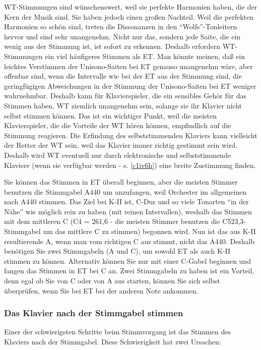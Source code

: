 WT-Stimmungen sind wünschenswert, weil sie perfekte Harmonien haben, die der Kern der Musik sind.
Sie haben jedoch einen großen Nachteil.
Weil die perfekten Harmonien so schön sind, treten die Dissonanzen in den \enquote{Wolfs}-Tonleitern hervor und sind sehr unangenehm.
Nicht nur das, sondern jede Saite, die ein wenig aus der Stimmung ist, ist sofort zu erkennen.
Deshalb erfordern WT-Stimmungen ein viel häufigeres Stimmen als ET.
Man könnte meinen, daß ein leichtes Verstimmen der Unisono-Saiten bei ET genauso unangenehm wäre, aber offenbar sind, wenn die Intervalle wie bei der ET aus der Stimmung sind, die geringfügigen Abweichungen in der Stimmung der Unisono-Saiten bei ET weniger wahrnehmbar.
Deshalb kann für Klavierspieler, die ein sensibles Gehör für das Stimmen haben, WT ziemlich unangenehm sein, solange sie ihr Klavier nicht selbst stimmen können.
Das ist ein wichtiger Punkt, weil die meisten Klavierspieler, die die Vorteile der WT hören können, empfindlich auf die Stimmung reagieren.
Die Erfindung des selbststimmenden Klaviers kann vielleicht der Retter der WT sein, weil das Klavier immer richtig gestimmt sein wird.
Deshalb wird WT eventuell nur durch elektronische und selbststimmende Klaviere (wenn sie verfügbar werden - s. \hyperref[c1iv6h]{\autoref{c1iv6h}}) eine breite Zustimmung finden.

Sie können das Stimmen in ET überall beginnen, aber die meisten Stimmer benutzen die Stimmgabel A440 um anzufangen, weil Orchester im allgemeinen nach A440 stimmen.
Das Ziel bei K-II ist, C-Dur und so viele Tonarten \enquote{in der Nähe} wie möglich rein zu haben (mit reinen Intervallen), weshalb das Stimmen mit dem mittleren C (C4 = 261,6 - die meisten Stimmer benutzen die C523,3-Stimmgabel um das mittlere C zu stimmen) begonnen wird.
Nun ist das aus K-II resultierende A, wenn man vom richtigen C aus stimmt, nicht das A440.
Deshalb benötigen Sie zwei Stimmgabeln (A und C), um sowohl ET als auch K-II stimmen zu können.
Alternativ können Sie nur mit einer C-Gabel beginnen und fangen das Stimmen in ET bei C an.
Zwei Stimmgabeln zu haben ist ein Vorteil, denn egal ob Sie von C oder von A aus starten, können Sie sich selbst überprüfen, wenn Sie bei ET bei der anderen Note ankommen.


\label{c2_6b}
\subsubsection{Das Klavier nach der Stimmgabel stimmen}
\label{c2_6_gabe}

Einer der schwierigsten Schritte beim Stimmvorgang ist das Stimmen des Klaviers nach der Stimmgabel.
Diese Schwierigkeit hat zwei Ursachen:

